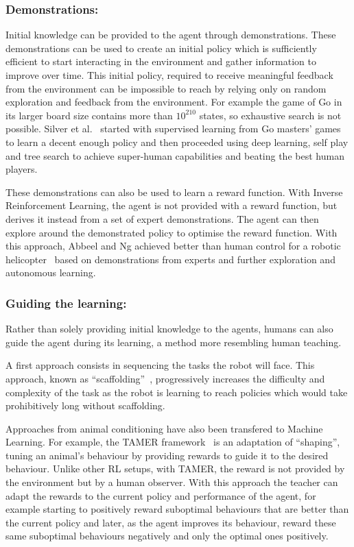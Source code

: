 \documentclass[letterpaper]{article} %
\begin{document}
\subsubsection{Demonstrations:} 

Initial knowledge can be provided to the agent through demonstrations. These
demonstrations can be used to create an initial policy which is sufficiently
efficient to start interacting in the environment and gather information to
improve over time. This initial policy, required to receive meaningful feedback
from the environment can be impossible to reach by relying only on random
exploration and feedback from the environment. For example the game of Go in its
larger board size contains more than $10^{210}$ states, so exhaustive search is
not possible.  Silver et al.~\cite{silver2016mastering} started with supervised
learning from Go masters' games to learn a decent enough policy and then
proceeded using deep learning, self play and tree search to achieve super-human
capabilities and beating the best human players.

These demonstrations can also be used to learn a reward function. With Inverse
Reinforcement Learning, the agent is not provided with a reward function, but
derives it instead from a set of expert demonstrations. The agent can then
explore around the demonstrated policy to optimise the reward function. With
this approach, Abbeel and Ng achieved better than human control for a robotic
helicopter~\cite{abbeel2004apprenticeship} based on demonstrations from experts
and further exploration and autonomous learning.

\subsubsection{Guiding the learning:}

Rather than solely providing initial knowledge to the agents, humans can also
guide the agent during its learning, a method more resembling human teaching. 

A first approach consists in sequencing the tasks the robot will face.  This
approach, known as ``scaffolding''~\cite{saunders2006teaching}, progressively
increases the difficulty and complexity of the task as the robot is learning to
reach policies which would take prohibitively long without scaffolding.

Approaches from animal conditioning have also been transfered to Machine
Learning. For example, the TAMER framework~\cite{knox2009interactively} is an
adaptation of ``shaping'', tuning an animal's behaviour by providing rewards to
guide it to the desired behaviour. Unlike other RL setups, with TAMER, the
reward is not provided by the environment but by a human observer. With this
approach the teacher can adapt the rewards to the current policy and performance
of the agent, for example starting to positively reward suboptimal behaviours
that are better than the current policy and later, as the agent improves its
behaviour, reward these same suboptimal behaviours negatively and only the
optimal ones positively.
\end{document}
